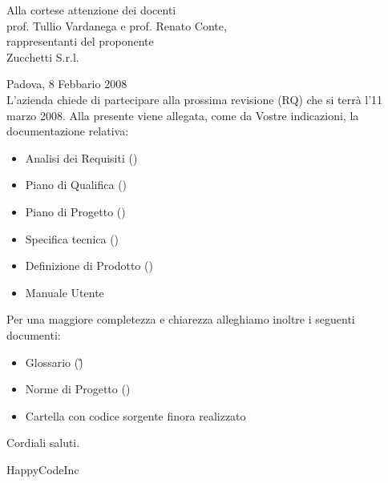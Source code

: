 


\newcommand{\dt}{ Lettera di accompagnamento }%




\thispagestyle{plain}
\begin{flushright}
Alla cortese attenzione dei docenti\\
prof. Tullio Vardanega e prof. Renato Conte,\\
rappresentanti del proponente\\
Zucchetti S.r.l.
\end{flushright}
Padova, 8 Febbario 2008 \\

L'azienda  chiede di partecipare alla prossima revisione (RQ) che si terr\`a l'11 marzo 2008.
Alla presente viene allegata, come da Vostre indicazioni, la documentazione relativa:
\begin{itemize}
\item{}Analisi dei Requisiti (\AR)
\item{}Piano di Qualifica (\PdQ)
\item{}Piano di Progetto (\PdP)
\item{}Specifica tecnica (\ST) 
\item{}Definizione di Prodotto (\DdP)
\item{}Manuale Utente
\end{itemize}
Per una maggiore completezza e chiarezza alleghiamo inoltre i seguenti documenti:
\begin{itemize}
\item{}Glossario (\G)
\item{}Norme di Progetto (\NdP)
\item{}Cartella con codice sorgente finora realizzato
\end{itemize}
Cordiali saluti.
\begin{flushright}
HappyCodeInc
\end{flushright}
\newpage


